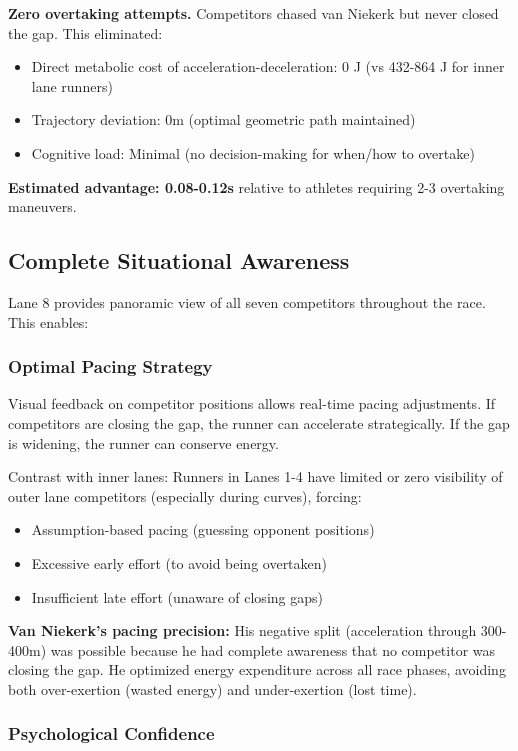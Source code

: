 \textbf{Zero overtaking attempts.} Competitors chased van Niekerk but never closed the gap. This eliminated:
\begin{itemize}
    \item Direct metabolic cost of acceleration-deceleration: 0 J (vs 432-864 J for inner lane runners)
    \item Trajectory deviation: 0m (optimal geometric path maintained)
    \item Cognitive load: Minimal (no decision-making for when/how to overtake)
\end{itemize}

\textbf{Estimated advantage: 0.08-0.12s} relative to athletes requiring 2-3 overtaking maneuvers.

\subsection{Complete Situational Awareness}

Lane 8 provides panoramic view of all seven competitors throughout the race. This enables:

\subsubsection{Optimal Pacing Strategy}

Visual feedback on competitor positions allows real-time pacing adjustments. If competitors are closing the gap, the runner can accelerate strategically. If the gap is widening, the runner can conserve energy.

Contrast with inner lanes: Runners in Lanes 1-4 have limited or zero visibility of outer lane competitors (especially during curves), forcing:
\begin{itemize}
    \item Assumption-based pacing (guessing opponent positions)
    \item Excessive early effort (to avoid being overtaken)
    \item Insufficient late effort (unaware of closing gaps)
\end{itemize}

\textbf{Van Niekerk's pacing precision:} His negative split (acceleration through 300-400m) was possible because he had complete awareness that no competitor was closing the gap. He optimized energy expenditure across all race phases, avoiding both over-exertion (wasted energy) and under-exertion (lost time).

\subsubsection{Psychological Confidence}

